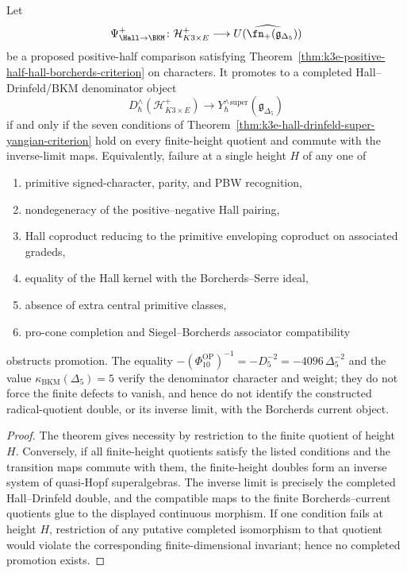 \begin{corollary}
\label{cor:k3e-finite-height-promotion-obstruction}
Let
\[
 \Psi^+_{\Hall\to\BKM}\colon
 \mathcal H^+_{K3\times E}
 \longrightarrow
 \widehat{U(\fn_+(\mathfrak g_{\Delta_5}))}
\]
be a proposed positive-half comparison satisfying
Theorem~\ref{thm:k3e-positive-half-hall-borcherds-criterion} on
characters. It promotes to a completed Hall--Drinfeld/BKM denominator
object
\[
 D^\wedge_\hbar(\mathcal H^+_{K3\times E})
 \longrightarrow
 Y^\wedge_\hbar{}^{\mathrm{super}}(\mathfrak g_{\Delta_5})
\]
if and only if the seven conditions of
Theorem~\ref{thm:k3e-hall-drinfeld-super-yangian-criterion} hold on
every finite-height quotient and commute with the inverse-limit maps.
Equivalently, failure at a single height \(H\) of any one of
\begin{enumerate}[label=\textup{(\alph*)}]
\item primitive signed-character, parity, and PBW recognition,
\item nondegeneracy of the positive--negative Hall pairing,
\item Hall coproduct reducing to the primitive enveloping coproduct on
associated gradeds,
\item equality of the Hall kernel with the Borcherds--Serre ideal,
\item absence of extra central primitive classes,
\item pro-cone completion and Siegel--Borcherds associator compatibility
\end{enumerate}
obstructs promotion. The equality
\(-(\Phi_{10}^{\mathrm{OP}})^{-1}=-D_5^{-2}=-4096\,\Delta_5^{-2}\) and the value
\(\kappa_{\mathrm{BKM}}(\Delta_5)=5\) verify the denominator character
and weight; they do not force the finite defects to vanish, and hence
do not identify the constructed radical-quotient double, or its inverse
limit, with the Borcherds current object.
\end{corollary}

\begin{proof}
The theorem gives necessity by restriction to the finite quotient of
height \(H\). Conversely, if all finite-height quotients satisfy the
listed conditions and the transition maps commute with them, the
finite-height doubles form an inverse system of quasi-Hopf
superalgebras. The inverse limit is precisely the completed
Hall--Drinfeld double, and the compatible maps to the finite
Borcherds--current quotients glue to the displayed continuous morphism.
If one condition fails at height \(H\), restriction of any putative
completed isomorphism to that quotient would violate the corresponding
finite-dimensional invariant; hence no completed promotion exists.
\end{proof}

